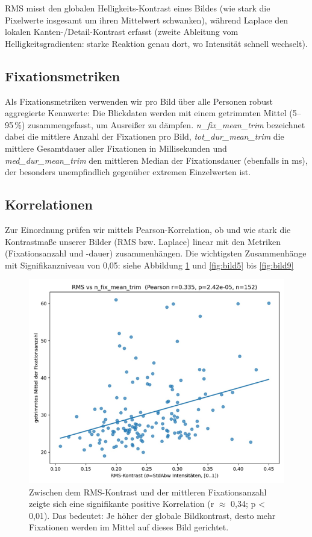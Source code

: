 \documentclass[
    language=german, %
    thesis=seminar, %
    supervisor=postdoc, %
    multiauthor=true, %
    ]{settings/csssa-thesis}
\begin{document}
RMS misst den globalen Helligkeits-Kontrast eines Bildes (wie stark die Pixelwerte insgesamt um ihren Mittelwert schwanken),
während Laplace den lokalen Kanten-/Detail-Kontrast erfasst (zweite Ableitung vom Helligkeitsgradienten: starke Reaktion genau dort, wo Intensität schnell wechselt).

\subsection{Fixationsmetriken}
Als Fixationsmetriken verwenden wir pro Bild über alle Personen robust aggregierte Kennwerte: Die Blickdaten werden mit einem getrimmten Mittel (5–95\,\%) zusammengefasst, um Ausreißer zu dämpfen. 
\textit{n\_fix\_mean\_trim} bezeichnet dabei die mittlere Anzahl der Fixationen pro Bild, \textit{tot\_dur\_mean\_trim} die mittlere Gesamtdauer aller Fixationen in Millisekunden und \textit{med\_dur\_mean\_trim} den mittleren Median der Fixationsdauer (ebenfalls in ms), 
der besonders unempfindlich gegenüber extremen Einzelwerten ist.


\subsection{Korrelationen}
Zur Einordnung prüfen wir mittels Pearson-Korrelation, ob und wie stark die Kontrastmaße unserer Bilder (RMS bzw. Laplace) linear mit den Metriken (Fixationsanzahl und -dauer) zusammenhängen.
Die wichtigsten Zusammenhänge mit Signifikanzniveau von 0,05:
siehe Abbildung \ref{fig:bild4} und \ref{fig:bild5} bis \ref{fig:bild9}

\begin{figure}[h]
    \centering
    \includegraphics[width=\linewidth,height=0.8\textheight,keepaspectratio]{figures/Bild4.png}
    \caption{
          Zwischen dem RMS-Kontrast und der mittleren Fixationsanzahl zeigte sich eine signifikante positive Korrelation (r $\approx$ 0,34; p < 0,01). Das bedeutet: Je höher der globale Bildkontrast, desto mehr Fixationen werden im Mittel auf dieses Bild gerichtet.
}\label{fig:bild4}
\end{figure}
\end{document}
